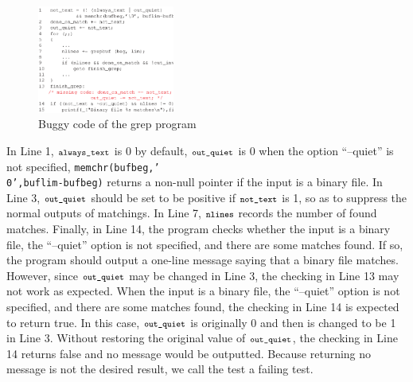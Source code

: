 \documentclass{sig-alternate}
\newcommand{\CodeIn}[1]{{\small\texttt{#1}}}
\begin{document}
\begin{figure}[t]
\begin{center}
  \includegraphics[angle=0,width=0.4\textwidth]{figs/example11.eps}
  \centering
  \caption{Buggy code of the grep program}
  \label{fig:example1}
\end{center}
\end{figure}



In Line 1, $\CodeIn{always\_text}$ is 0 by default,
$\CodeIn{out\_quiet}$ is 0 when the option ``--quiet'' is not
specified, \CodeIn{memchr(bufbeg,'\\0',buflim-bufbeg)} returns a
non-null pointer if the input is a binary file. In Line 3,
$\CodeIn{out\_quiet}$ should be set to be positive if
$\CodeIn{not\_text}$ is 1, so as to suppress the normal outputs of
matchings. In Line 7, $\CodeIn{nlines}$ records the number of found
matches. Finally, in Line 14, the program checks whether the input
is a binary file, the ``--quiet'' option is not specified, and there
are some matches found. If so, the program should output a one-line
message saying that a binary file matches. However, since
$\CodeIn{out\_quiet}$ may be changed in Line 3, the checking in Line
13 may not work as expected. When the input is a binary file, the
``--quiet'' option is not specified, and there are some matches
found, the checking in Line 14 is expected to return true. In this
case, $\CodeIn{out\_quiet}$ is originally 0 and then is changed to
be 1 in Line 3. Without restoring the original value of
$\CodeIn{out\_quiet}$, the checking in Line 14 returns false and no
message would be outputted. Because returning no message is not the
desired result, we call the test a failing test.
\end{document}
